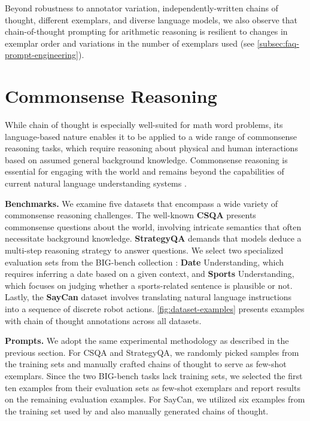 Beyond robustness to annotator variation, independently-written chains of thought, different exemplars, and diverse language models, we also observe that chain-of-thought prompting for arithmetic reasoning is resilient to changes in exemplar order and variations in the number of exemplars used (see \cref{subsec:faq-prompt-engineering}).

\section{Commonsense Reasoning}\label{sec:commonsense-reasoning}

While chain of thought is especially well-suited for math word problems, its language-based nature enables it to be applied to a wide range of commonsense reasoning tasks, which require reasoning about physical and human interactions based on assumed general background knowledge. Commonsense reasoning is essential for engaging with the world and remains beyond the capabilities of current natural language understanding systems \citep{talmor2022commonsenseqa}.

\textbf{Benchmarks.}  
We examine five datasets that encompass a wide variety of commonsense reasoning challenges. The well-known \textbf{CSQA} \citep{talmor-etal-2019-commonsenseqa} presents commonsense questions about the world, involving intricate semantics that often necessitate background knowledge.  
\textbf{StrategyQA} \citep{geva-etal-2021-aristotle} demands that models deduce a multi-step reasoning strategy to answer questions. We select two specialized evaluation sets from the BIG-bench collection \citep{bigbench}: \textbf{Date} Understanding, which requires inferring a date based on a given context, and \textbf{Sports} Understanding, which focuses on judging whether a sports-related sentence is plausible or not. Lastly, the \textbf{SayCan} dataset \citep{ahn2022can} involves translating natural language instructions into a sequence of discrete robot actions.  
\cref{fig:dataset-examples} presents examples with chain of thought annotations across all datasets.

\textbf{Prompts.}  
We adopt the same experimental methodology as described in the previous section. For CSQA and StrategyQA, we randomly picked samples from the training sets and manually crafted chains of thought to serve as few-shot exemplars. Since the two BIG-bench tasks lack training sets, we selected the first ten examples from their evaluation sets as few-shot exemplars and report results on the remaining evaluation examples. For SayCan, we utilized six examples from the training set used by \citet{ahn2022can} and also manually generated chains of thought.

